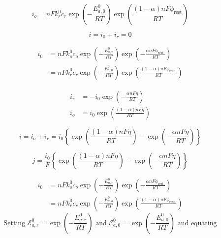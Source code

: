 \documentclass[lettersize,journal]{IEEEtran}
\begin{document}
\begin{equation}
i_{o}=n F k_{r}^{0} c_{r} \exp \left(-\frac{E_{a, 0}^{0}}{R T}\right) \exp \left(\frac{(1-\alpha) n F \phi_{\mathrm{rest}}}{R T}\right)
\end{equation}

\begin{equation}
i=i_{0}+i_{r}=0
\end{equation}

\begin{equation}
\begin{aligned}
i_{0} &=n F k_{o}^{0} c_{o} \exp \left(-\frac{E_{a, r}^{0}}{R T}\right) \exp \left(-\frac{\alpha n F \phi_{\text {rest }}}{R T}\right) \\
&=n F k_{r}^{0} c_{r} \exp \left(-\frac{E_{a, 0}^{0}}{R T}\right) \exp \left(\frac{(1-\alpha) n F \phi_{\text {rest }}}{R T}\right)
\end{aligned}
\end{equation}

\begin{equation}
\begin{aligned}
i_{r} &=-i_{0} \exp \left(-\frac{\alpha n F \eta}{R T}\right) \\
i_{o} &=i_{0} \exp \left(\frac{(1-\alpha) n F \eta}{R T}\right)
\end{aligned}
\end{equation}

\begin{equation}
i=i_{o}+i_{r}=i_{0}\left\{\exp \left(\frac{(1-\alpha) n F \eta}{R T}\right)-\exp \left(-\frac{\alpha n F \eta}{R T}\right)\right\}
\end{equation}


\begin{equation}
j=\frac{i_{0}}{F}\left\{\exp \left(\frac{(1-\alpha) n F \eta}{R T}\right)-\exp \left(-\frac{\alpha n F \eta}{R T}\right)\right\}
\end{equation}

\begin{equation}
\begin{aligned}
i_{0} &=n F k_{o}^{0} c_{o} \exp \left(-\frac{E_{a, r}^{0}}{R T}\right) \exp \left(-\frac{\alpha n F \phi_{\text {rest }}}{R T}\right) \\
&=n F k_{r}^{0} c_{r} \exp \left(-\frac{E_{a, o}^{0}}{R T}\right) \exp \left(\frac{(1-\alpha) n F \phi_{\text {rest }}}{R T}\right)
\end{aligned}
\end{equation}
\begin{equation}
\text { Setting } \mathscr{E}_{a, r}^{0}=\exp \left(-\frac{E_{a, r}^{0}}{R T}\right) \text { and } \mathscr{E}_{a, 0}^{0}=\exp \left(-\frac{E_{a, 0}^{0}}{R T}\right) \text { and equating }
\end{equation}
\end{document}
